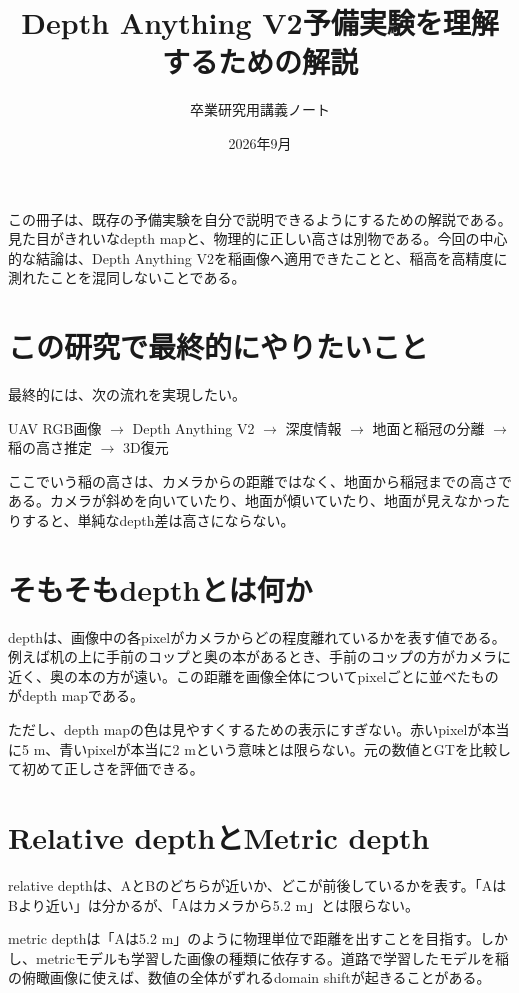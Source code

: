 \documentclass[a4paper,11pt]{ltjsarticle}
\title{\bfseries Depth Anything V2予備実験を理解するための解説}
\author{卒業研究用講義ノート}
\date{2026年9月}
\begin{document}
\maketitle
\begin{important}
この冊子は、既存の予備実験を自分で説明できるようにするための解説である。見た目がきれいなdepth mapと、物理的に正しい高さは別物である。今回の中心的な結論は、Depth Anything V2を稲画像へ適用できたことと、稲高を高精度に測れたことを混同しないことである。
\end{important}
\tableofcontents
\clearpage

\section{この研究で最終的にやりたいこと}
最終的には、次の流れを実現したい。
\begin{center}
UAV RGB画像 $\rightarrow$ Depth Anything V2 $\rightarrow$ 深度情報 $\rightarrow$ 地面と稲冠の分離 $\rightarrow$ 稲の高さ推定 $\rightarrow$ 3D復元
\end{center}
ここでいう稲の高さは、カメラからの距離ではなく、地面から稲冠までの高さである。カメラが斜めを向いていたり、地面が傾いていたり、地面が見えなかったりすると、単純なdepth差は高さにならない。

\section{そもそもdepthとは何か}
depthは、画像中の各pixelがカメラからどの程度離れているかを表す値である。例えば机の上に手前のコップと奥の本があるとき、手前のコップの方がカメラに近く、奥の本の方が遠い。この距離を画像全体についてpixelごとに並べたものがdepth mapである。

ただし、depth mapの色は見やすくするための表示にすぎない。赤いpixelが本当に5 m、青いpixelが本当に2 mという意味とは限らない。元の数値とGTを比較して初めて正しさを評価できる。

\section{Relative depthとMetric depth}
relative depthは、AとBのどちらが近いか、どこが前後しているかを表す。「AはBより近い」は分かるが、「Aはカメラから5.2 m」とは限らない。

metric depthは「Aは5.2 m」のように物理単位で距離を出すことを目指す。しかし、metricモデルも学習した画像の種類に依存する。道路で学習したモデルを稲の俯瞰画像に使えば、数値の全体がずれるdomain shiftが起きることがある。
\end{document}
